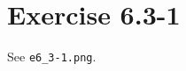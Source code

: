 \documentclass{article}
\begin{document}
\section*{Exercise 6.3-1}

See \texttt{e6\_3-1.png}.
\end{document}
